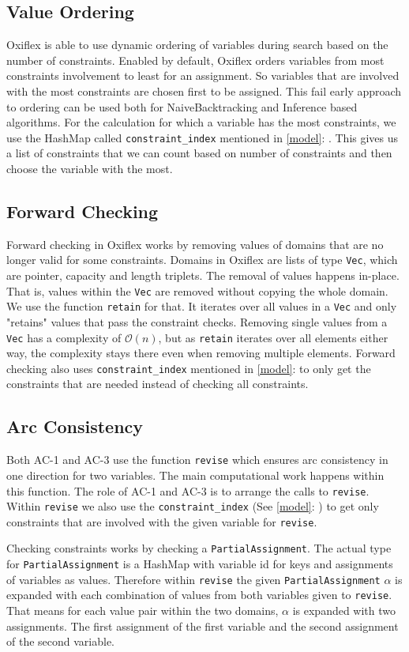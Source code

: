 \subsection{Value Ordering}

Oxiflex is able to use dynamic ordering of variables during search based on the number of constraints. Enabled by default, Oxiflex orders variables from most constraints involvement to least for an assignment. So variables that are involved with the most constraints are chosen first to be assigned. This fail early approach to ordering can be used both for NaiveBacktracking and Inference based algorithms. For the calculation for which a variable has the most constraints, we use the HashMap called \verb|constraint_index| mentioned in \cref{model}: . This gives us a list of constraints that we can count based on number of constraints and then choose the variable with the most.

\subsection{Forward Checking}

Forward checking in Oxiflex works by removing values of domains that are no longer valid for some constraints. Domains in Oxiflex are lists of type \verb|Vec|, which are pointer, capacity and length triplets. The removal of values happens in-place. That is, values within the \verb|Vec| are removed without copying the whole domain. We use the function \verb|retain| for that. It iterates over all values in a \verb|Vec| and only "retains" values that pass the constraint checks. Removing single values from a \verb|Vec| has a complexity of $\mathcal{O}(n)$, but as \verb|retain| iterates over all elements either way, the complexity stays there even when removing multiple elements. Forward checking also uses \verb|constraint_index| mentioned in \cref{model}:  to only get the constraints that are needed instead of checking all constraints.

\subsection{Arc Consistency}

Both AC-1 and AC-3 use the function \verb|revise| which ensures arc consistency in one direction for two variables. The main computational work happens within this function. The role of AC-1 and AC-3 is to arrange the calls to \verb|revise|. Within \verb|revise| we also use the \verb|constraint_index| (See \ref{model}: ) to get only constraints that are involved with the given variable for \verb|revise|.

Checking constraints works by checking a \verb|PartialAssignment|. The actual type for \verb|PartialAssignment| is a HashMap with variable id for keys and assignments of variables as values. Therefore within \verb|revise| the given \verb|PartialAssignment| $\alpha$ is expanded with each combination of values from both variables given to \verb|revise|. That means for each value pair within the two domains, $\alpha$ is expanded with two assignments. The first assignment of the first variable and the second assignment of the second variable.
